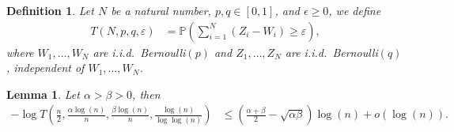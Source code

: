 \documentclass[english]{article}
\newtheorem{lemma}{Lemma}
\newtheorem{definition}{Definition}
\newcommand{\eps}{\varepsilon}
\newcommand{\1}{\textbf{1}}
\newcommand{\pp}{\frac{\alpha\log(n)}{n}}
\newcommand{\qq}{\frac{\beta\log(n)}{n}}
\newcommand{\p}{\mathbb{P}}
\begin{document}
\begin{definition}\label{def:definitionofT}
Let $N$ be a natural number, $p,q\in [0,1]$, and $\epsilon\geq 0$, we define
\begin{align}
T(N,p, q , \eps) &= \p\left( \sum_{i=1}^N (Z_i - W_i) \geq \eps \right),
\end{align}
where $W_1,\dots, W_N$ are i.i.d.\ Bernoulli$(p)$ and $Z_1,\dots, Z_N$ are i.i.d.\ Bernoulli$(q)$, independent of $W_1,\dots, W_N$.
\end{definition}

%

\begin{lemma}\label{lemma-conv}
Let $\alpha>\beta>0$, then
\begin{align}
 -\log T\left(\frac{n}2,\pp, \qq , \frac{\log(n)}{\log\log(n)}\right)  &\leq   \left( \frac{\alpha + \beta}2 - \sqrt{\alpha \beta} \right) \log(n) +o\left(\log (n)\right). 
\end{align}
\end{lemma}
\end{document}
